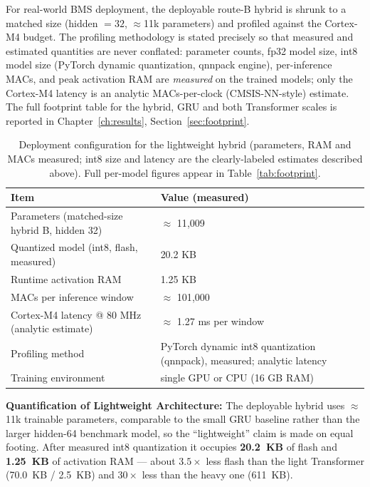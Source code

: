 For real-world BMS deployment, the deployable route-B hybrid is shrunk to a
matched size (hidden $=32$, $\approx$11k parameters) and profiled against the
Cortex-M4 budget. The profiling methodology is stated precisely so that measured
and estimated quantities are never conflated: parameter counts, fp32 model size,
int8 model size (PyTorch dynamic quantization, qnnpack engine), per-inference
MACs, and peak activation RAM are \emph{measured} on the trained models; only
the Cortex-M4 latency is an analytic MACs-per-clock (CMSIS-NN-style) estimate.
The full footprint table for the hybrid, GRU and both Transformer scales is
reported in Chapter~\ref{ch:results}, Section~\ref{sec:footprint}.

\begin{table}[H]
\centering
\caption{Deployment configuration for the lightweight hybrid (parameters, RAM and
MACs measured; int8 size and latency are the clearly-labeled estimates described
above). Full per-model figures appear in Table~\ref{tab:footprint}.}
\label{tab:resource}
\begin{tabularx}{\textwidth}{@{} l X @{}}
\toprule
\textbf{Item} & \textbf{Value (measured)} \\
\midrule
Parameters (matched-size hybrid B, hidden 32) & $\approx$ 11{,}009 \\
Quantized model (int8, flash, measured) & 20.2 KB \\
Runtime activation RAM & 1.25 KB \\
MACs per inference window & $\approx$ 101{,}000 \\
Cortex-M4 latency @ 80 MHz (analytic estimate) & $\approx$ 1.27 ms per window \\
Profiling method & PyTorch dynamic int8 quantization (qnnpack), measured; analytic latency \\
Training environment & single GPU or CPU (16 GB RAM) \\
\bottomrule
\end{tabularx}
\end{table}

\noindent \textbf{Quantification of Lightweight Architecture:}
The deployable hybrid uses $\approx$11k trainable parameters, comparable to the
small GRU baseline rather than the larger hidden-64 benchmark model, so the
``lightweight'' claim is made on equal footing. After measured int8 quantization
it occupies \textbf{20.2~KB} of flash and \textbf{1.25~KB} of activation RAM ---
about $3.5\times$ less flash than the light Transformer (70.0~KB / 2.5~KB) and
$30\times$ less than the heavy one (611~KB).

